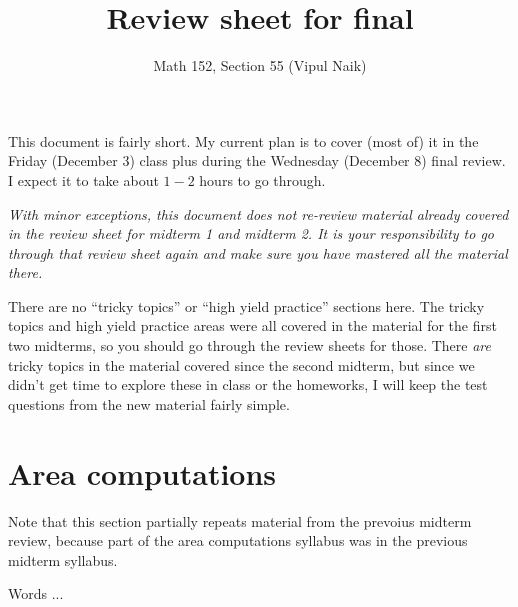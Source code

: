 \documentclass[10pt]{amsart}
\title{Review sheet for final}
\author{Math 152, Section 55 (Vipul Naik)}
\begin{document}
\maketitle

This document is fairly short. My current plan is to cover (most of)
it in the Friday (December 3) class plus during the Wednesday
(December 8) final review. I expect it to take about $1-2$ hours to go
through.

{\em With minor exceptions, this document does not re-review material
already covered in the review sheet for midterm 1 and midterm 2. It is
your responsibility to go through that review sheet again and make
sure you have mastered all the material there.}

There are no ``tricky topics'' or ``high yield practice'' sections
here. The tricky topics and high yield practice areas were all covered
in the material for the first two midterms, so you should go through
the review sheets for those. There {\em are} tricky topics in the
material covered since the second midterm, but since we didn't get
time to explore these in class or the homeworks, I will keep the test
questions from the new material fairly simple.

\section{Area computations}

Note that this section partially repeats material from the prevoius
midterm review, because part of the area computations syllabus was in
the previous midterm syllabus.

Words ...
\end{document}
